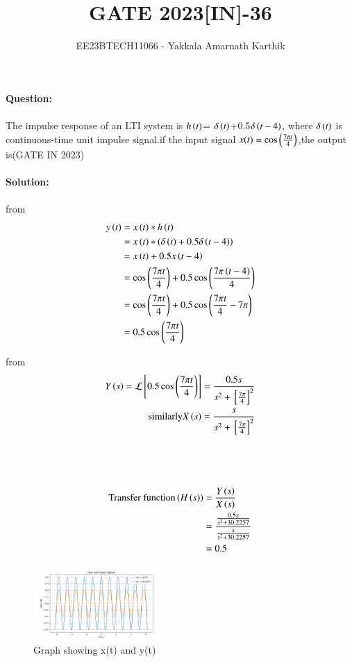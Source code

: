 \documentclass[journal,12pt,twocolumn]{IEEEtran}
\begin{document}


\title{GATE 2023[IN]-36}
\author{EE23BTECH11066 - Yakkala Amarnath Karthik}
\maketitle

\textbf{Question:}\\ \\
The impulse response of an LTI system is $h\left(t\right)$= $\delta\left(t\right)$+0.5$ \delta\left(t-4\right)$, where $\delta\left(t\right)$ is continuous-time unit impulse signal.if the input signal $x(t)=\cos\left(\frac{7\pi t}{4}\right)$,the output is\hfill(GATE IN 2023)\\ \\

\textbf{Solution:}\\
\\
 from 
\begin{align}
    y\left(t\right) &=x\left(t\right) * h\left(t\right)\\
            &=x\left(t\right) * \left(\delta\left(t\right)+0.5 \delta\left(t-4\right)\right)\\
            &=x\left(t\right)+0.5x\left(t-4\right)\\
            &=\cos\left(\frac{7\pi t}{4}\right)+0.5\cos\left(\frac{7\pi \left(t-4\right)}{4}\right)\\
            &=\cos\left(\frac{7\pi t}{4}\right)+0.5\cos\left(\frac{7\pi t}{4}-7\pi\right)\\
            &=0.5\cos\left(\frac{7\pi t}{4}\right)
\end{align}

from 
\begin{align}
    Y\left(s\right)=\mathcal{L}{}\left[0.5\cos{\ensuremath{\left(\frac{7\pi t}{4}\right)}}\right]=\frac{0.5s}{s^2+{}\left[\frac{7\pi}{4}\right]^2}\\
    \text{similarly} X\left(s\right)=\frac{s}{s^2+{}\left[\frac{7\pi}{4}\right]^2}
\end{align}
\\ \\ \\
\begin{align}
    \text{Transfer function}\left(H\left(s\right)\right)&=\frac{Y\left(s\right)}{X\left(s\right)}\\
    &=\frac{{\frac{0.5s}{s^2+30.2257}}}{{\frac{s}{s^2+30.2257}}}\\
    &=0.5
\end{align}
\bigskip
\bigskip
  \begin{figure}[ht]
        \hspace{1cm}\includegraphics[width=0.45\textwidth]{figs/pythongate.png}
        \caption{Graph showing x(t) and y(t)}
    \end{figure} 
\end{document}
